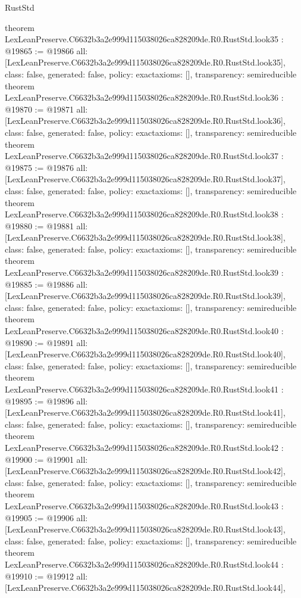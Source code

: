 \begin{lexlean}{RustStd}
\begin{coremodule}
{}
theorem LexLeanPreserve.C6632b3a2e999d115038026ca828209de.R0.RustStd.look35 : @19865 := @19866 {
  all: [LexLeanPreserve.C6632b3a2e999d115038026ca828209de.R0.RustStd.look35],
  class: false,
  generated: false,
  policy: exact{axioms: []},
  transparency: semireducible
}
theorem LexLeanPreserve.C6632b3a2e999d115038026ca828209de.R0.RustStd.look36 : @19870 := @19871 {
  all: [LexLeanPreserve.C6632b3a2e999d115038026ca828209de.R0.RustStd.look36],
  class: false,
  generated: false,
  policy: exact{axioms: []},
  transparency: semireducible
}
theorem LexLeanPreserve.C6632b3a2e999d115038026ca828209de.R0.RustStd.look37 : @19875 := @19876 {
  all: [LexLeanPreserve.C6632b3a2e999d115038026ca828209de.R0.RustStd.look37],
  class: false,
  generated: false,
  policy: exact{axioms: []},
  transparency: semireducible
}
theorem LexLeanPreserve.C6632b3a2e999d115038026ca828209de.R0.RustStd.look38 : @19880 := @19881 {
  all: [LexLeanPreserve.C6632b3a2e999d115038026ca828209de.R0.RustStd.look38],
  class: false,
  generated: false,
  policy: exact{axioms: []},
  transparency: semireducible
}
theorem LexLeanPreserve.C6632b3a2e999d115038026ca828209de.R0.RustStd.look39 : @19885 := @19886 {
  all: [LexLeanPreserve.C6632b3a2e999d115038026ca828209de.R0.RustStd.look39],
  class: false,
  generated: false,
  policy: exact{axioms: []},
  transparency: semireducible
}
theorem LexLeanPreserve.C6632b3a2e999d115038026ca828209de.R0.RustStd.look40 : @19890 := @19891 {
  all: [LexLeanPreserve.C6632b3a2e999d115038026ca828209de.R0.RustStd.look40],
  class: false,
  generated: false,
  policy: exact{axioms: []},
  transparency: semireducible
}
theorem LexLeanPreserve.C6632b3a2e999d115038026ca828209de.R0.RustStd.look41 : @19895 := @19896 {
  all: [LexLeanPreserve.C6632b3a2e999d115038026ca828209de.R0.RustStd.look41],
  class: false,
  generated: false,
  policy: exact{axioms: []},
  transparency: semireducible
}
theorem LexLeanPreserve.C6632b3a2e999d115038026ca828209de.R0.RustStd.look42 : @19900 := @19901 {
  all: [LexLeanPreserve.C6632b3a2e999d115038026ca828209de.R0.RustStd.look42],
  class: false,
  generated: false,
  policy: exact{axioms: []},
  transparency: semireducible
}
theorem LexLeanPreserve.C6632b3a2e999d115038026ca828209de.R0.RustStd.look43 : @19905 := @19906 {
  all: [LexLeanPreserve.C6632b3a2e999d115038026ca828209de.R0.RustStd.look43],
  class: false,
  generated: false,
  policy: exact{axioms: []},
  transparency: semireducible
}
theorem LexLeanPreserve.C6632b3a2e999d115038026ca828209de.R0.RustStd.look44 : @19910 := @19912 {
  all: [LexLeanPreserve.C6632b3a2e999d115038026ca828209de.R0.RustStd.look44],
}
\end{coremodule}
\end{lexlean}
